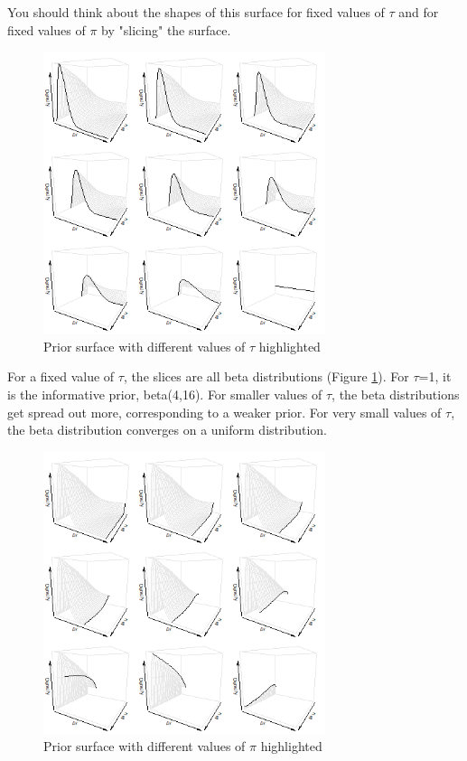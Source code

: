 \documentclass[12pt]{article}
\begin{document}
You should think about the shapes of this surface for fixed values of $\tau$ and for fixed values of $\pi$ by "slicing" the surface.

\begin{figure}
\begin{center}
\includegraphics[width=3.25in]{fig4.png}
\end{center}
\caption{Prior surface with different values of $\tau$ highlighted \label{fig:hedging_surface1}}
\end{figure}

For a fixed value of $\tau$, the slices are all beta distributions (Figure \ref{fig:hedging_surface1}). For $\tau$=1, it is the informative prior, beta(4,16). For smaller values of $\tau$, the beta distributions get spread out more, corresponding to a weaker prior. For very small values of $\tau$, the beta distribution converges on a uniform distribution.

\begin{figure}
\begin{center}
\includegraphics[width=3.25in]{fig5.png}
\end{center}
\caption{Prior surface with different values of $\pi$ highlighted \label{fig:hedging_surface2}}
\end{figure}
\end{document}
